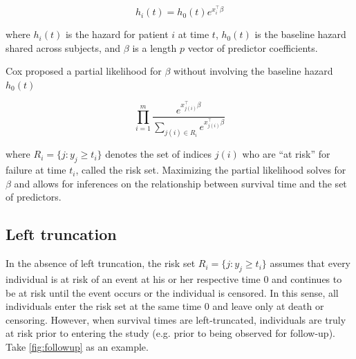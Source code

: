 \documentclass[11pt,final,fleqn]{article}\usepackage[]{graphicx}\usepackage[]{color}
\theoremstyle{plain}
\begin{document}
\begin{equation}
h_i(t) = h_0(t)e^{x_i^\intercal\beta}
\end{equation}

where $h_i(t)$ is the hazard for patient $i$ at time $t$, $h_0(t)$ is the baseline hazard shared across subjects, and $\beta$ is a length $p$ vector of predictor coefficients.  

Cox\cite{cox1972regression} proposed a partial likelihood for $\beta$ without involving the baseline hazard $h_0(t)$

\begin{equation} \label{eqn:cox1972}
\prod_{i=1}^{m} \frac{e^{x_{j(i)}^\intercal\beta}}{\sum_{j(i)\in R_i}  e^{x_{j(i)}^\intercal\beta}   } 
\end{equation}

where  $R_i = \{ j : y_j \geq t_i\}$ denotes the set of indices $j(i)$ who are ``at risk'' for failure at time $t_i$, called the risk set. Maximizing the partial likelihood solves for $\beta$ and allows for inferences on the relationship between survival time and the set of predictors. 

\subsection{Left truncation}
In the absence of left truncation, the risk set $R_i = \{ j : y_j \geq t_i \}$ assumes that every individual is at risk of an event at his or her respective time 0 and continues to be at risk until the event occurs or the individual is censored. In this sense, all individuals enter the risk set at the same time 0 and leave only at death or censoring. However, when survival times are left-truncated, individuals are truly at risk prior to entering the study (e.g. prior to being observed for follow-up). Take \autoref{fig:followup} as an example.
\end{document}
